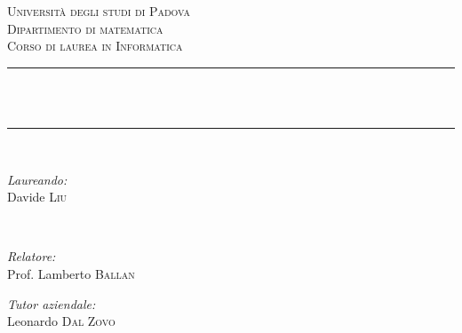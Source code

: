 \begin{titlepage}

\newcommand{\HRule}{\rule{\linewidth}{0.5mm}} %

\center %
 

\textsc{\LARGE Università degli studi di Padova}\\[0.5cm] %
\textsc{\Large Dipartimento di matematica}\\[0.5cm] %
\textsc{\large Corso di laurea in Informatica}\\[0.5cm] %


\HRule \\[0.4cm]
{ \huge \bfseries \titolo}\\[0.4cm] %
\HRule \\[1.5cm]
 

\begin{minipage}{0.4\textwidth}
\begin{flushleft} \large
\emph{Laureando:}\\
Davide \textsc{Liu} %
\end{flushleft}
\end{minipage}
~
\begin{minipage}{0.4\textwidth}
\begin{flushright} \large
\emph{Relatore:} \\
Prof. Lamberto \textsc{Ballan} %
\end{flushright}
\begin{flushright} \large
\emph{Tutor aziendale:} \\
Leonardo \textsc{Dal Zovo} %
\end{flushright}
\end{minipage}\\[1cm]


\end{titlepage}
